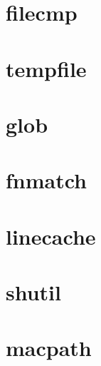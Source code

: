 \section{filecmp}





\section{tempfile}





\section{glob}





\section{fnmatch}





\section{linecache}





\section{shutil}





\section{macpath}






